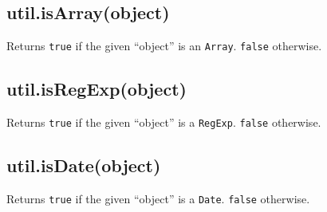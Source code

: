 \subsection{util.isArray(object)}\label{util.isarrayobject}

Returns \texttt{true} if the given ``object'' is an \texttt{Array}.
\texttt{false} otherwise.

\begin{Shaded}
\begin{Highlighting}[]
 \NormalTok{(}\NormalTok{);}

\NormalTok{([])}
\NormalTok{(} 
\NormalTok{(\{\})}
\end{Highlighting}
\end{Shaded}

\subsection{util.isRegExp(object)}\label{util.isregexpobject}

Returns \texttt{true} if the given ``object'' is a \texttt{RegExp}.
\texttt{false} otherwise.

\begin{Shaded}
\begin{Highlighting}[]
 \NormalTok{(}\NormalTok{);}

\NormalTok{(}\NormalTok{)}
\NormalTok{(} \NormalTok{(}\NormalTok{))}
\NormalTok{(\{\})}
\end{Highlighting}
\end{Shaded}

\subsection{util.isDate(object)}\label{util.isdateobject}

Returns \texttt{true} if the given ``object'' is a \texttt{Date}.
\texttt{false} otherwise.

